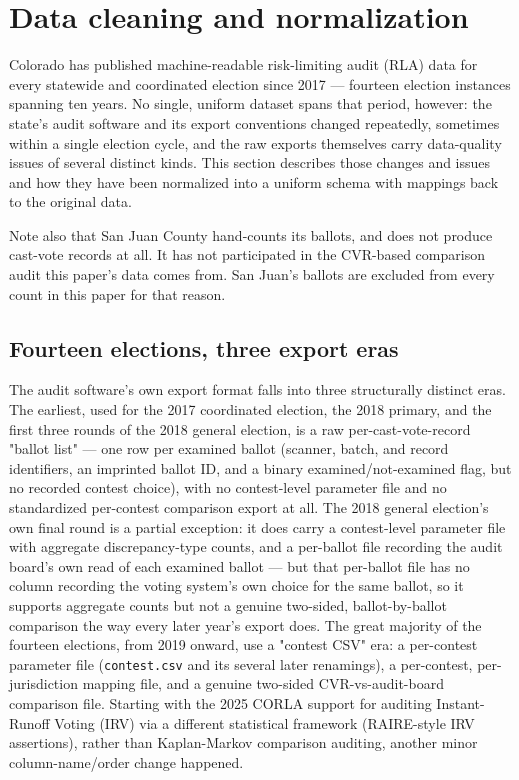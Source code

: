 \section{Data cleaning and normalization}

Colorado has published machine-readable risk-limiting audit (RLA) data for
every statewide and coordinated election since 2017 — fourteen election
instances spanning ten years. No single, uniform dataset spans that
period, however: the state's audit software and its export conventions
changed repeatedly, sometimes within a single election cycle, and the raw
exports themselves carry data-quality issues of several distinct kinds.
This section describes those changes and issues
and how they have been normalized into a uniform schema with mappings
back to the original data.

Note also that San Juan County hand-counts its ballots, and does not produce
cast-vote records at all. It has not participated in the CVR-based comparison audit this paper's data
comes from. San Juan's ballots are excluded from every count in this paper for that reason.

\subsection{Fourteen elections, three export eras}

The audit software's own export format falls into three structurally
distinct eras. The earliest, used for the 2017 coordinated election, the
2018 primary, and the first three rounds of the 2018 general election, is
a raw per-cast-vote-record "ballot list" — one row per examined ballot
(scanner, batch, and record identifiers, an imprinted ballot ID, and a
binary examined/not-examined flag, but no recorded contest choice), with
no contest-level parameter file and no standardized per-contest
comparison export at all. The 2018 general election's own final round is
a partial exception: it does carry a contest-level parameter file with aggregate
discrepancy-type counts, and a per-ballot file recording the audit board's
own read of each examined ballot — but that per-ballot file has no column
recording the voting system's own choice for the same ballot, so it
supports aggregate counts but not a genuine two-sided, ballot-by-ballot
comparison the way every later year's export does. The great majority of
the fourteen elections, from 2019 onward, use a "contest CSV" era: a
per-contest parameter file (\texttt{contest.csv} and its several later
renamings), a per-contest, per-jurisdiction mapping file, and a genuine
two-sided CVR-vs-audit-board comparison file.  Starting with the 2025 CORLA
support for auditing Instant-Runoff Voting (IRV) via a different
statistical framework (RAIRE-style IRV assertions), rather than
Kaplan-Markov comparison auditing, another minor column-name/order change happened.

